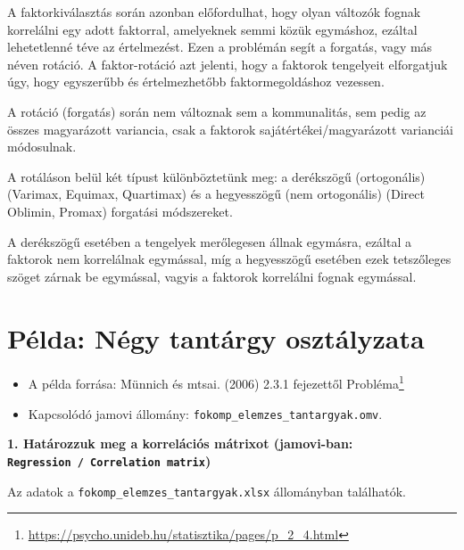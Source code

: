 \documentclass[
  letterpaper,
]{krantz}
\providecommand{\tightlist}{%
  \setlength{\itemsep}{0pt}\setlength{\parskip}{0pt}}\usepackage{longtable,booktabs,array}
\renewcommand{\href}[2]{#2\footnote{\url{#1}}}
\begin{document}
A faktorkiválasztás során azonban előfordulhat, hogy olyan változók
fognak korrelálni egy adott faktorral, amelyeknek semmi közük egymáshoz,
ezáltal lehetetlenné téve az értelmezést. Ezen a problémán segít a
forgatás, vagy más néven rotáció. A faktor-rotáció azt jelenti, hogy a
faktorok tengelyeit elforgatjuk úgy, hogy egyszerűbb és értelmezhetőbb
faktormegoldáshoz vezessen.

A rotáció (forgatás) során nem változnak sem a kommunalitás, sem pedig
az összes magyarázott variancia, csak a faktorok
sajátértékei/magyarázott varianciái módosulnak.

A rotáláson belül két típust különböztetünk meg: a derékszögű
(ortogonális) (Varimax, Equimax, Quartimax) és a hegyesszögű (nem
ortogonális) (Direct Oblimin, Promax) forgatási módszereket.

A derékszögű esetében a tengelyek merőlegesen állnak egymásra, ezáltal a
faktorok nem korrelálnak egymással, míg a hegyesszögű esetében ezek
tetszőleges szöget zárnak be egymással, vagyis a faktorok korrelálni
fognak egymással.

\hypertarget{puxe9lda-nuxe9gy-tantuxe1rgy-osztuxe1lyzata}{%
\section{Példa: Négy tantárgy
osztályzata}\label{puxe9lda-nuxe9gy-tantuxe1rgy-osztuxe1lyzata}}

\begin{itemize}
\tightlist
\item
  A példa forrása: Münnich és mtsai. (2006)
  \href{https://psycho.unideb.hu/statisztika/pages/p_2_4.html}{2.3.1
  fejezettől Probléma}
\item
  Kapcsolódó jamovi állomány: \texttt{fokomp\_elemzes\_tantargyak.omv}.
\end{itemize}

\textbf{1. Határozzuk meg a korrelációs mátrixot (jamovi-ban:
\texttt{Regression\ /\ Correlation\ matrix})}

Az adatok a \texttt{fokomp\_elemzes\_tantargyak.xlsx} állományban
találhatók.
\end{document}
